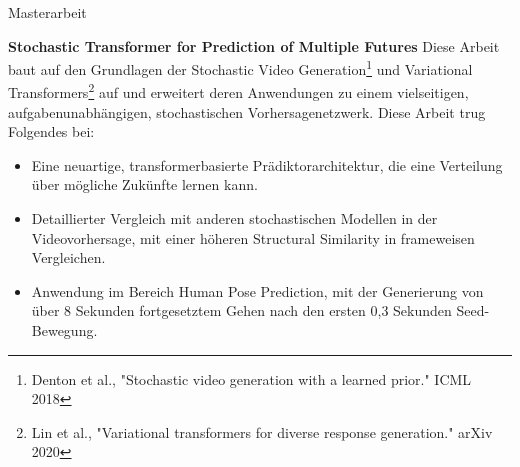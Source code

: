 \begin{rubric}{Masterarbeit}

\entry*[2023]%
\textbf{Stochastic Transformer for Prediction of Multiple Futures}  \newline  
Diese Arbeit baut auf den Grundlagen der Stochastic Video Generation\footnote{Denton et al., "Stochastic video generation with a learned prior." ICML 2018} und Variational Transformers\footnote{Lin et al., "Variational transformers for diverse response generation." arXiv 2020} auf und erweitert deren Anwendungen zu einem vielseitigen, aufgabenunabhängigen, stochastischen Vorhersagenetzwerk. Diese Arbeit trug Folgendes bei: \newline  
\vspace{\CVItemizeHeaderSpacing} \begin{itemize}
	\setlength{\itemsep}{\CVItemizeSpacing}  
	\item Eine neuartige, transformerbasierte Prädiktorarchitektur, die eine Verteilung über mögliche Zukünfte lernen kann.  
	\item Detaillierter Vergleich mit anderen stochastischen Modellen in der Videovorhersage, mit einer höheren Structural Similarity in frameweisen Vergleichen.  
	\item Anwendung im Bereich Human Pose Prediction, mit der Generierung von über 8 Sekunden fortgesetztem Gehen nach den ersten 0,3 Sekunden Seed-Bewegung.  
\end{itemize}


\end{rubric}